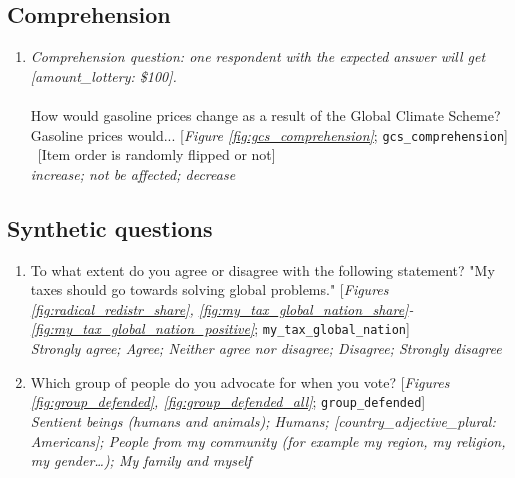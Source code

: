  \subsection*{Comprehension} 
 \begin{enumerate}[resume] 
\item  \label{q:gcs_comprehension} \textit{Comprehension question: one respondent with the expected answer will get [amount\_lottery: \$100].}\\\\How would gasoline prices change as a result of the Global Climate Scheme? \\Gasoline prices would... [\textit{Figure \ref{fig:gcs_comprehension}}; 
\verb|gcs_comprehension|]
~[Item order is randomly flipped or not]
  \\ \textit{increase; not be affected; decrease}

\end{enumerate} 

 \subsection*{Synthetic questions} 
 \begin{enumerate}[resume] 
\item  \label{q:my_tax_global_nation} To what extent do you agree or disagree with the following statement? "My taxes should go towards solving global problems." [\textit{Figures \ref{fig:radical_redistr_share}, \ref{fig:my_tax_global_nation_share}-\ref{fig:my_tax_global_nation_positive}}; 
\verb|my_tax_global_nation|]
  \\ \textit{Strongly agree; Agree; Neither agree nor disagree; Disagree; Strongly disagree}

\item  \label{q:group_defended} Which group of people do you advocate for when you vote? [\textit{Figures \ref{fig:group_defended}, \ref{fig:group_defended_all}}; 
\verb|group_defended|]
  \\ \textit{Sentient beings (humans and animals); Humans; [country\_adjective\_plural: Americans]; People from my community (for example my region, my religion, my gender…); My family and myself}

\end{enumerate} 

